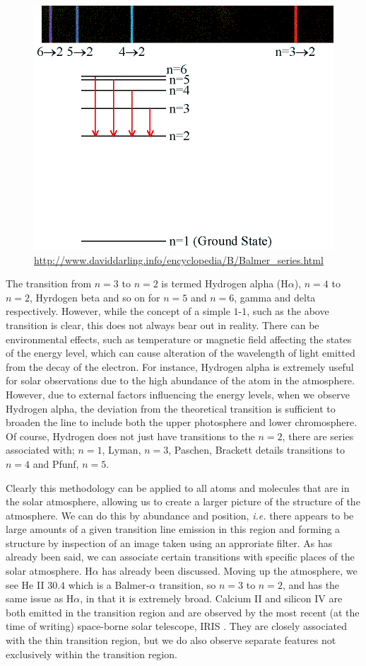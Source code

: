 \begin{figure}
	\centering
	\includegraphics[scale=0.5]{Chapter1/Figs/Balmer_series}
	\caption{\url{http://www.daviddarling.info/encyclopedia/B/Balmer_series.html}}
	\label{fig:balmer}
\end{figure}

The transition from $n=3$ to $n=2$ is termed Hydrogen alpha (H$\alpha$), $n=4$ to $n=2$, Hyrdogen beta and so on for $n=5$ and $n=6$, gamma and delta respectively. 
However, while the concept of a simple $1$-$1$, such as the above transition is clear, this does not always bear out in reality.
There can be environmental effects, such as temperature or magnetic field affecting the states of the energy level, which can cause alteration of the wavelength of light emitted from the decay of the electron.
For instance, Hydrogen alpha is extremely useful for solar observations due to the high abundance of the atom in the atmosphere.
However, due to external factors influencing the energy levels, when we observe Hydrogen alpha, the deviation from the theoretical transition is sufficient to broaden the line to include both the upper photosphere and lower chromosphere.
Of course, Hydrogen does not just have transitions to the $n=2$, there are series associated with; $n=1$, Lyman, $n=3$, Paschen, Brackett details transitions to $n=4$ and Pfunf, $n=5$.

Clearly this methodology can be applied to all atoms and molecules that are in the solar atmosphere, allowing us to create a larger picture of the structure of the atmosphere.
We can do this by abundance and position, \emph{i.e.} there appears to be large amounts of a given transition line emission in this region and forming a structure by inspection of an image taken using an approriate filter.
As has already been said, we can associate certain transitions with specific places of the solar atmosphere.
H$\alpha$ has already been discussed.
Moving up the atmosphere, we see He II $30.4$ \cite{Bazin2010} which is a Balmer-$\alpha$ transition, so $n=3$ to $n=2$, and has the same issue as H$\alpha$, in that it is extremely broad.
Calcium II and silicon IV are both emitted in the transition region and are observed by the most recent (at the time of writing) space-borne solar telescope, IRIS \cite{PereiraIRIS2014}.
They are closely associated with the thin transition region, but we do also observe separate features not exclusively within the transition region.

